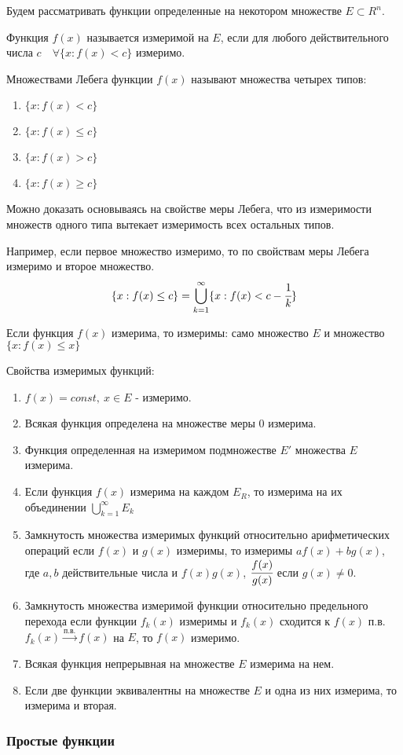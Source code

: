 \documentclass[14pt]{extarticle}
\theoremstyle{definition}
\theoremstyle{remark}
\newcommand{\be}{\begin{enumerate}}
\newcommand{\ee}{\end{enumerate}}
\renewcommand{\[}{\begin{dmath*}[compact]}
\renewcommand{\]}{\end{dmath*}}
\newcommand{\sep}{ , \ \allowbreak }
\begin{document}
Будем рассматривать функции определенные на некотором множестве $E \subset R^n$.

Функция $f(x)$ называется измеримой на $E$, если для любого действительного числа $c \quad \forall \{x: f(x) < c \}$ измеримо.

Множествами Лебега функции $f(x)$ называют множества четырех типов:

\be
  \item $\{x: f(x) < c\}$
  \item $\{x: f(x) \leq c\}$
  \item $\{x: f(x) > c\}$
  \item $\{x: f(x) \geq c\}$
\ee

Можно доказать основываясь на свойстве меры Лебега, что из измеримости множеств одного типа вытекает измеримость всех остальных типов.

Например, если первое множество измеримо, то по свойствам меры Лебега измеримо и второе множество.
\[\{x: f(x) \leq c\}= \bigcup_{k=1}^\infty\{x:f(x) < c - \cfrac{1}{k}\}\]

Если функция $f(x)$ измерима, то измеримы: само множество $E$ и множество $\{x:f(x)\leq x\}$

Свойства измеримых функций:

\be
  \item $f(x)=const \sep x \in E$ - измеримо.
  \item Всякая функция определена на множестве меры 0 измерима.
  \item Функция определенная на измеримом подмножестве $E'$ множества $E$ измерима.
  \item Если функция $f(x)$ измерима на каждом $E_R$, то измерима на их объединении $\bigcup _ {k=1}^\infty E_k$
  \item Замкнутость множества измеримых функций относительно арифметических операций если $f(x)$ и $g(x)$ измеримы, то измеримы $af(x)+ bg(x)$, где $a,b$ действительные числа и $f(x)g(x)$, $\cfrac{f(x)}{g(x)}$ если $g(x) \neq 0$.
  \item Замкнутость множества измеримой функции относительно предельного перехода если функции $f_k(x)$ измеримы и $f_k(x)$ сходится к $f(x)$ п.в. $f_k(x) \xrightarrow{п.в.} f(x)$ на $E$, то $f(x)$ измеримо.
  \item Всякая функция непрерывная на множестве $E$ измерима на нем.
  \item Если две функции эквивалентны на множестве $E$ и одна из них измерима, то измерима и вторая.
\ee

\subsubsection{Простые функции}
\end{document}
